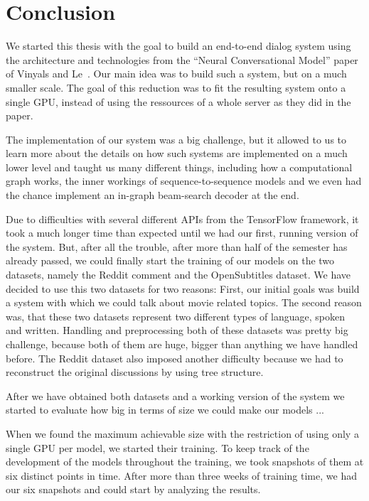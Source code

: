 \chapter{Conclusion}

We started this thesis with the goal to build an end-to-end dialog system using the architecture and technologies from the ``Neural Conversational Model'' paper of Vinyals and Le~\cite{Vinyals:2015}. Our main idea was to build such a system, but on a much smaller scale. The goal of this reduction was to fit the resulting system onto a single GPU, instead of using the ressources of a whole server as they did in the paper.

The implementation of our system was a big challenge, but it allowed to us to learn more about the details on how such systems are implemented on a much lower level and taught us many different things, including how a computational graph works, the inner workings of sequence-to-sequence models and we even had the chance implement an in-graph beam-search decoder at the end.

Due to difficulties with several different APIs from the TensorFlow framework, it took a much longer time than expected until we had our first, running version of the system. But, after all the trouble, after more than half of the semester has already passed, we could finally start the training of our models on the two datasets, namely the Reddit comment and the OpenSubtitles dataset. We have decided to use this two datasets for two reasons: First, our initial goals was build a system with which we could talk about movie related topics. The second reason was, that these two datasets represent two different types of language, spoken and written. Handling and preprocessing both of these datasets was pretty big challenge, because both of them are huge, bigger than anything we have handled before. The Reddit dataset also imposed another difficulty because we had to reconstruct the original discussions by using tree structure.

After we have obtained both datasets and a working version of the system we started to evaluate how big in terms of size we could make our models ...

When we found the maximum achievable size with the restriction of using only a single GPU per model, we started their training. To keep track of the development of the models throughout the training, we took snapshots of them at six distinct points in time. After more than three weeks of training time, we had our six snapshots and could start by analyzing the results.

